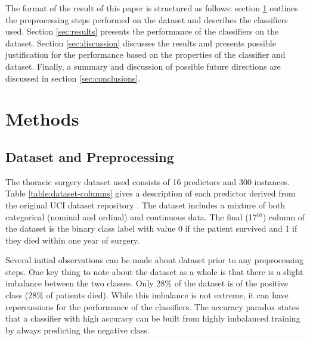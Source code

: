 \documentclass[journal]{IEEEtran}
\begin{document}
The format of the result of this paper is structured as follows: section \ref{sec:methods} outlines the preprocessing steps performed on the dataset and describes the classifiers used. Section \ref{sec:results} presents the performance of the classifiers on the dataset. Section \ref{sec:discussion} discusses the results and presents possible justification for the performance based on the properties of the classifier and dataset. Finally, a summary and discussion of possible future directions are discussed in section \ref{sec:conclusions}.

\section{Methods}
\label{sec:methods}

\subsection{Dataset and Preprocessing}
\label{subsec:dataset}
The thoracic surgery dataset used consists of 16 predictors and 300 instances. Table \ref{table:dataset-columns} gives a description of each predictor derived from the original UCI dataset repository \cite{uic2016thoracic}. The dataset includes a mixture of both categorical (nominal and ordinal) and continuous data. The final (17$^{th}$) column of the dataset is the binary class label with value 0 if the patient survived and 1 if they died within one year of surgery.

Several initial observations can be made about dataset prior to any preprocessing steps. One key thing to note about the dataset as a whole is that there is a slight imbalance between the two classes. Only 28\% of the dataset is of the positive class (28\% of patients died). While this imbalance is not extreme, it can have repercussions for the performance of the classifiers. The accuracy paradox \cite{bishop2006pattern} states that a classifier with high accuracy can be built from highly imbalanced training by always predicting the negative class.
\end{document}

